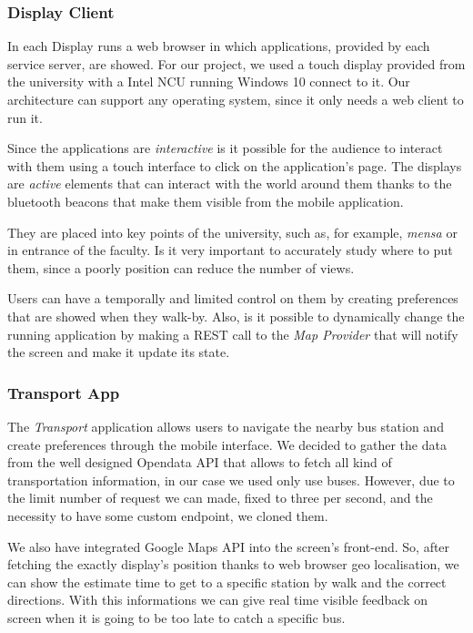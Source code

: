 \documentclass[]{usiinfbachelorproject}
\begin{document}
\subsubsection{Display Client}
In each Display runs a web browser in which applications, provided by each service server, are showed. For our project, we used a touch display provided from the university with a Intel NCU running Windows 10 connect to it. Our architecture can support any operating system, since it only needs a web client to run it.
  
 Since the applications are \emph{interactive} is it possible for the audience to interact with them using a touch interface to click on the application's page. The displays are \emph{active} elements that can interact with the world around them thanks to the bluetooth beacons that make them visible from the mobile application.
 
They are placed into key points of the university, such as, for example, \emph{mensa} or in entrance of the faculty. Is it very important to accurately study where to put them, since a poorly position can reduce the number of views.

Users can have a temporally and limited control on them by creating preferences that are showed when they walk-by.
Also, is it possible to dynamically change the running application by making a REST call to the \emph{Map Provider} that will notify the screen and make it update its state.


\subsubsection{Transport App}
The \emph{Transport} application allows users to navigate the nearby bus station and create preferences through the mobile interface. We decided to gather the data from the well designed Opendata API that allows to fetch all kind of transportation information, in our case we used only use buses.
However, due to the limit number of request we can made, fixed to three per second, and the necessity to have some custom endpoint, we cloned them.

We also have integrated Google Maps API into the screen's front-end. So, after fetching the exactly display's position thanks to web browser geo localisation, we can show the estimate time to get to a specific station by walk and the correct directions. With this informations we can give real time visible feedback on screen when it is going to be too late to catch a specific bus.
\end{document}
